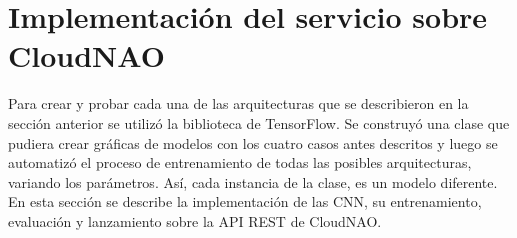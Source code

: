 %
%
%
%
%
%
%

%

\section{Implementación del servicio sobre CloudNAO}



Para crear y probar cada una de las arquitecturas que se
describieron en la sección anterior se utilizó la biblioteca
de TensorFlow.
Se construyó una clase que pudiera crear gráficas de modelos
con los cuatro casos antes descritos y luego se automatizó el proceso de
entrenamiento de todas las posibles arquitecturas, variando los parámetros.
Así, cada instancia de la clase, es un modelo diferente. En esta sección se 
describe la implementación de las CNN, su entrenamiento, evaluación
y lanzamiento sobre la API REST de CloudNAO.


